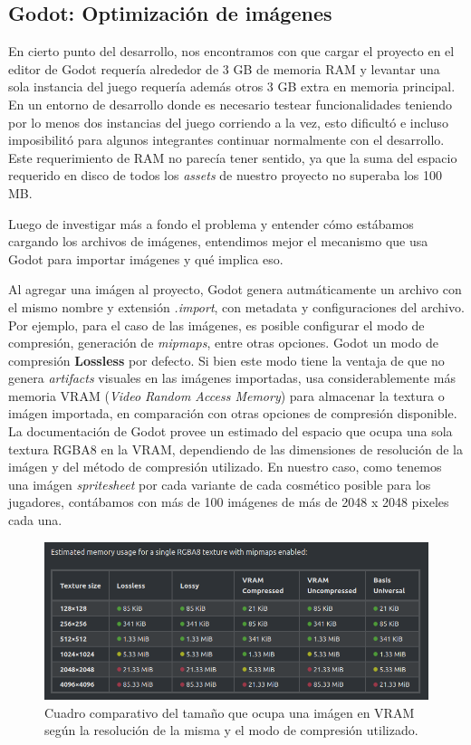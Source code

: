 \subsection{Godot: Optimización de imágenes}

En cierto punto del desarrollo, nos encontramos con que cargar el proyecto en el editor de Godot
requería alrededor de 3 GB de memoria RAM y levantar una sola instancia del juego requería además
otros 3 GB extra en memoria principal. En un entorno de desarrollo donde es necesario testear
funcionalidades teniendo por lo menos dos instancias del juego corriendo a la vez, esto dificultó e incluso
imposibilitó para algunos integrantes continuar normalmente con el desarrollo. Este requerimiento
de RAM no parecía tener sentido, ya que la suma del espacio requerido en disco de todos los 
\textit{assets} de nuestro proyecto no superaba los 100 MB.

Luego de investigar más a fondo el problema y entender cómo estábamos cargando los archivos de imágenes,
entendimos mejor el mecanismo que usa Godot para importar imágenes y qué implica eso.

Al agregar una imágen al proyecto, Godot genera autmáticamente un archivo con el mismo nombre y extensión 
\textit{.import}, con metadata y configuraciones del archivo. 
Por ejemplo, para el caso de las imágenes, es posible configurar el modo de compresión, generación de 
\textit{mipmaps}, entre otras opciones. Godot un modo de compresión \textbf{Lossless} por defecto. 
Si bien este modo tiene la ventaja de que no genera \textit{artifacts} visuales en las imágenes importadas, usa 
considerablemente más memoria VRAM (\textit{Video Random Access Memory}) para almacenar la textura o
imágen importada, en comparación con otras opciones de compresión disponible.
La documentación de Godot\cite{ref2} provee un estimado del espacio que ocupa una sola textura
RGBA8 en la VRAM, dependiendo de las dimensiones de resolución de la imágen y del método de compresión utilizado.
En nuestro caso, como tenemos una imágen \textit{spritesheet} por cada variante de cada cosmético posible para los jugadores,
contábamos con más de 100 imágenes de más de 2048 x 2048 pixeles cada una. 

\begin{figure}[htbp]
    \centering
    \includegraphics[width=1.0\textwidth]{../assets/godot-docs-images.png}
    \caption{Cuadro comparativo del tamaño que ocupa una imágen en VRAM según la resolución
             de la misma y el modo de compresión utilizado.}
\end{figure}

